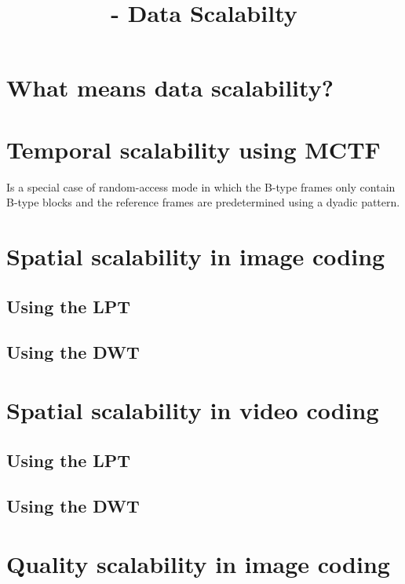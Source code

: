 


\title{\SM{} - Data Scalabilty}

\maketitle

\tableofcontents

\section{What means data scalability?}

\section{Temporal scalability using MCTF}

Is a special case of random-access mode in which the B-type frames
only contain B-type blocks and the reference frames are predetermined
using a dyadic pattern.

\section{Spatial scalability in image coding}

\subsection{Using the LPT}

\subsection{Using the DWT}

\section{Spatial scalability in video coding}

\subsection{Using the LPT}

\subsection{Using the DWT}

\section{Quality scalability in image coding}

